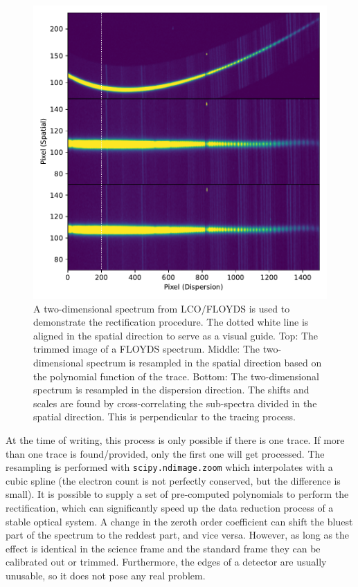 \documentclass[twocolumn, linenumbers]{aastex631}
\begin{document}
\begin{figure}
    \centering
    \includegraphics[width=\columnwidth]{fig_02_rectification.pdf}
    \caption{A two-dimensional spectrum from LCO/FLOYDS is used to demonstrate
    the rectification procedure. The dotted white line is aligned in the
    spatial direction to serve as a visual guide. Top: The trimmed image of a
    FLOYDS spectrum. Middle: The two-dimensional spectrum is resampled in the
    spatial direction based on the polynomial function of the trace. Bottom:
    The two-dimensional spectrum is resampled in the dispersion direction. The
    shifts and scales are found by cross-correlating the sub-spectra divided in
    the spatial direction. This is perpendicular to the tracing process.}
    \label{fig:rectify}
\end{figure}

At the time of writing, this process is only possible if there is one trace. If
more than one trace is found/provided, only the first one will get processed.
The resampling is performed with \texttt{scipy.ndimage.zoom} which interpolates
with a cubic spline (the electron count is not perfectly conserved, but the
difference is small). It is possible to supply a set of pre-computed polynomials
to perform the rectification, which can significantly speed up the data
reduction process of a stable optical system. A change in the zeroth order
coefficient can shift the bluest part of the spectrum to the reddest part, and
vice versa. However, as long as the effect is identical in the science frame
and the standard frame they can be calibrated out or trimmed. Furthermore, the
edges of a detector are usually unusable, so it does not pose any real problem.
\end{document}

